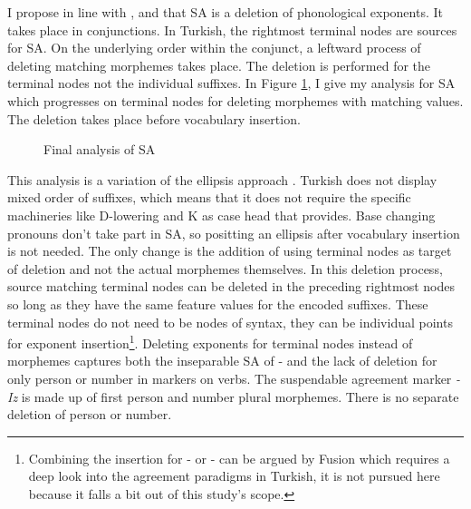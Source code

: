 I propose in line with \citet{guseva2017postsyntactic}, and \citet{erschler2018suspended} that SA is a deletion of phonological exponents. It takes place in conjunctions. In Turkish, the rightmost terminal nodes are sources for SA. On the underlying order within the conjunct, a leftward process of deleting matching morphemes takes place. The deletion is performed for the terminal nodes not the individual suffixes. In Figure \ref{fig:myanalysis}, I give my analysis for SA which progresses on terminal nodes for deleting morphemes with matching values. The deletion takes place before vocabulary insertion.

\begin{figure}[hbt!]
    \centering
    \caption{Final analysis of SA}
    \label{fig:myanalysis}
\end{figure}

This analysis is a variation of the ellipsis approach \citep{guseva2017postsyntactic,erschler2018suspended}. Turkish does not display mixed order of suffixes, which means that it does not require the specific machineries like D-lowering and K as case head that \citet{guseva2017postsyntactic} provides. Base changing pronouns don't take part in SA, so positting an ellipsis after vocabulary insertion \citep{erschler2018suspended} is not needed. The only change is the addition of using terminal nodes as target of deletion and not the actual morphemes themselves. In this deletion process, source matching terminal nodes can be deleted in the preceding rightmost nodes so long as they have the same feature values for the encoded suffixes. These terminal nodes do not need to be nodes of syntax, they can be individual points for exponent insertion\footnote{Combining the insertion for {\Pl-\Poss} or {\Pl-\Agr} can be argued by Fusion \citep{halle2000distributed} which requires a deep look into the agreement paradigms in Turkish, it is not pursued here because it falls a bit out of this study's scope.}. Deleting exponents for terminal nodes instead of morphemes captures both the inseparable SA of {\Pl-\Poss} and the lack of deletion for only person or number in {\Agr} markers on verbs. The suspendable agreement marker \textit{-Iz} is made up of first person and number plural morphemes. There is no separate deletion of person or number.


